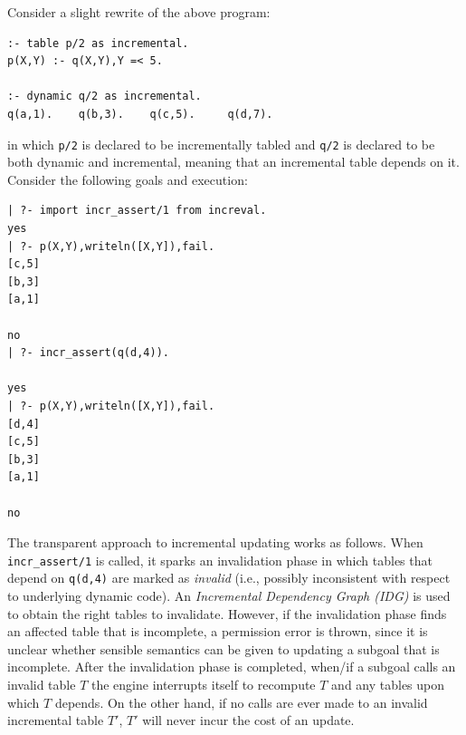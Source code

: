 %
Consider a slight rewrite of the above program:
\begin{verbatim}
:- table p/2 as incremental.
p(X,Y) :- q(X,Y),Y =< 5.

:- dynamic q/2 as incremental.
q(a,1).    q(b,3).    q(c,5).     q(d,7).
\end{verbatim}
in which {\tt p/2} is declared to be incrementally tabled
and {\tt q/2} is declared to be both dynamic and incremental, meaning
that an incremental table depends on it.
Consider the following goals and execution:
\begin{verbatim}
| ?- import incr_assert/1 from increval.
yes
| ?- p(X,Y),writeln([X,Y]),fail.
[c,5]
[b,3]
[a,1]

no
| ?- incr_assert(q(d,4)).

yes
| ?- p(X,Y),writeln([X,Y]),fail.
[d,4]
[c,5]
[b,3]
[a,1]

no
\end{verbatim}
\noindent
{}
The transparent approach to incremental updating works as follows.
When {\tt incr\_assert/1} is called, it sparks an invalidation
phase in which tables that depend on {\tt q(d,4)} are marked as {\em
  invalid} (i.e., possibly inconsistent with respect to underlying
dynamic code).  An {\em Incremental Dependency Graph (IDG)} is used to
obtain the right tables to invalidate.  However, if the invalidation
phase finds an affected table that is incomplete, a permission error
is thrown, since it is unclear whether sensible semantics can be given
to updating a subgoal that is incomplete.  After the invalidation
phase is completed, when/if a subgoal calls an invalid table $T$ the
engine interrupts itself to recompute $T$ and any tables upon which
$T$ depends.  On the other hand, if no calls are ever made to an
invalid incremental table $T'$, $T'$ will never incur the cost of an
update.

